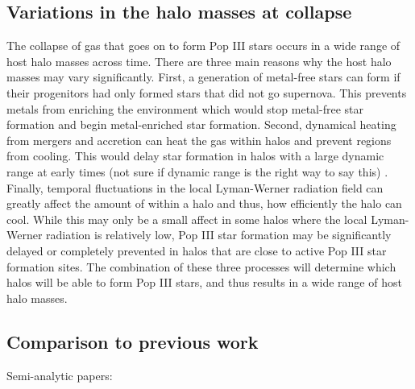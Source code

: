 \documentclass[a4paper,fleqn,usenatbib]{mnras}
\begin{document}
\subsection{Variations in the halo masses at collapse}
The collapse of gas that goes on to form Pop III stars occurs in a wide range of host halo masses across time. There are three main reasons why the host halo masses may vary significantly. First, a generation of metal-free stars can form if their progenitors had only formed stars that did not go supernova. This prevents metals from enriching the environment which would stop metal-free star formation and begin metal-enriched star formation. Second, dynamical heating from mergers and accretion can heat the gas within halos and prevent \hh{} regions from cooling. This would delay star formation in halos with a large dynamic range at early times (not sure if dynamic range is the right way to say this) \citep{Yoshida03}. Finally, temporal fluctuations in the local Lyman-Werner radiation field can greatly affect the amount of \hh{} within a halo and thus, how efficiently the halo can cool. While this may only be a small affect in some halos where the local Lyman-Werner radiation is relatively low, Pop III star formation may be significantly delayed or completely prevented in halos that are close to active Pop III star formation sites. The combination of these three processes will determine which halos will be able to form Pop III stars, and thus results in a wide range of host halo masses. 


\subsection{Comparison to previous work}

\li Semi-analytic papers: \citep{Tegmark97, Trenti09, Visbal18,
  Mebane18, Griffen18}
\end{document}
